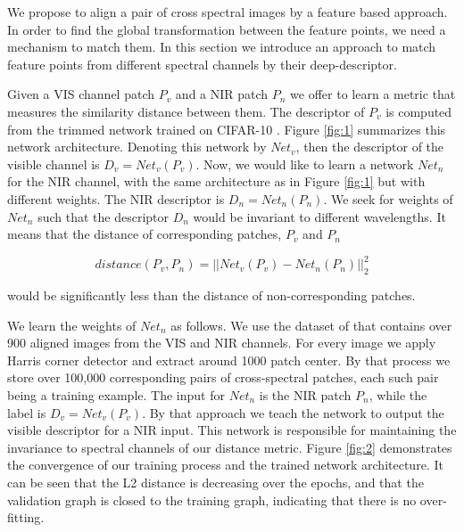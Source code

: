 \documentclass[10pt,twocolumn,letterpaper]{article}
\begin{document}
We propose to align a pair of cross spectral images by a feature based approach. In order to find the global transformation between the feature points, we need a mechanism to match them. In this section we introduce an approach to match feature points from different spectral channels by their deep-descriptor.

Given a VIS channel patch $P_v$ and a NIR patch $P_n$ we offer to learn a metric that measures the similarity distance between them. The descriptor of $P_v$ is computed from the trimmed network trained on CIFAR-10 \cite{krizhevsky2009learning}. Figure \ref{fig:1} summarizes this network architecture. Denoting this network by $Net_v$, then the descriptor of the visible channel is $D_v = Net_v(P_v)$. Now, we would like to learn a network $Net_n$ for the NIR channel, with the same architecture as in Figure \ref{fig:1} but with different weights. The NIR descriptor is $D_n = Net_n(P_n)$. We seek for weights of $Net_n$ such that the descriptor $D_n$ would be invariant to different wavelengths. It means that the distance of corresponding patches, $P_v$ and $P_n$

\begin{equation} \label{eq:distance}
distance(P_v,P_n) = || Net_v(P_v)-Net_n(P_n)||_2^2
\end{equation}

would be significantly less than the distance of non-corresponding patches.

We learn the weights of $Net_n$ as follows. We use the dataset of \cite{multiSpectralSIFT} that contains over 900 aligned images from the VIS and NIR channels. For every image we apply Harris corner detector \cite{harris} and extract around 1000 patch center. By that process we store over 100,000 corresponding pairs of cross-spectral patches, each such pair being a training example. The input for $Net_n$ is the NIR patch $P_n$, while the label is $D_v = Net_v(P_v)$. By that approach we teach the network to output the visible descriptor for a NIR input. This network is responsible for maintaining the invariance to spectral channels of our distance metric. Figure \ref{fig:2} demonstrates the convergence of our training process and the trained network architecture. It can be seen that the L2 distance is decreasing over the epochs, and that the validation graph is closed to the training graph, indicating that there is no over-fitting.
\end{document}
